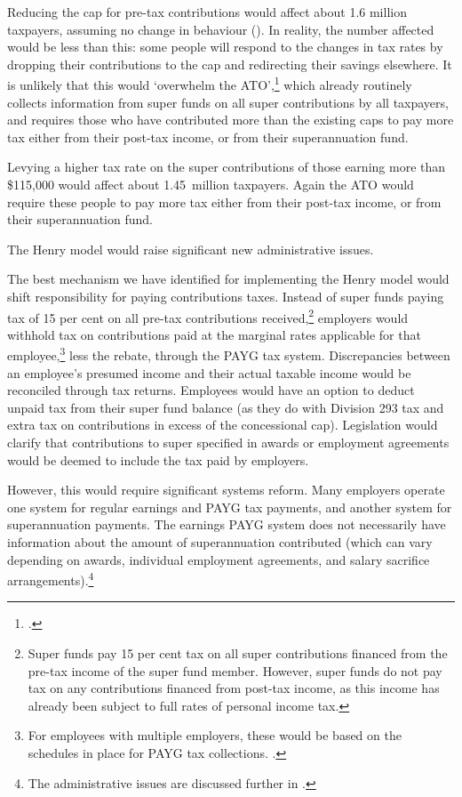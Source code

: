 \documentclass{grattanAlpha}
\begin{document}
Reducing the cap for pre-tax contributions would affect about 1.6 million taxpayers, assuming no change in behaviour (). In reality, the number affected would be less than this: some people will respond to the changes in tax rates by dropping their contributions to the cap and redirecting their savings elsewhere. It is unlikely that this would ‘overwhelm the ATO’,\footcite{Sloan2015a}  which already routinely collects information from super funds on all super contributions by all taxpayers, and requires those who have contributed more than the existing caps to pay more tax either from their post-tax income, or from their superannuation fund.

Levying a higher tax rate on the super contributions of those earning more than \$115,000 would affect about 1.45~million taxpayers. Again the ATO would require these people to pay more tax either from their post-tax income, or from their superannuation fund.

The Henry model would raise significant new administrative issues.

The best mechanism we have identified for implementing the Henry model would shift responsibility for paying contributions taxes. Instead of super funds paying tax of 15 per cent on all pre-tax contributions received,\footnote{Super funds pay 15 per cent tax on all super contributions financed from the pre-tax income of the super fund member. However, super funds do not pay tax on any contributions financed from post-tax income, as this income has already been subject to full rates of personal income tax. }  employers would withhold tax on contributions paid at the marginal rates applicable for that employee,\footnote{For employees with multiple employers, these would be based on the schedules in place for PAYG tax collections. \textcite{ATO2015WhenYouHaveIncomeFromTwoPayers}.}  less the rebate, through the PAYG tax system. Discrepancies between an employee’s presumed income and their actual taxable income would be reconciled through tax returns. Employees would have an option to deduct unpaid tax from their super fund balance (as they do with Division 293 tax and extra tax on contributions in excess of the concessional cap). Legislation would clarify that contributions to super specified in awards or employment agreements would be deemed to include the tax paid by employers.

However, this would require significant systems reform. Many employers operate one system for regular earnings and PAYG tax payments, and another system for superannuation payments. The earnings PAYG system does not necessarily have information about the amount of superannuation contributed (which can vary depending on awards, individual employment agreements, and salary sacrifice arrangements).\footnote{The administrative issues are discussed further in \textcite{Mercer2015SubmissionToReThink}.} 
\end{document}
